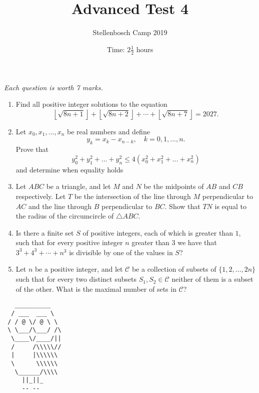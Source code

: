 \documentclass{article}
\title{Advanced Test 4}
\author{Stellenbosch Camp 2019}
\date{Time: $2\frac{1}{2}$ hours}
\begin{document}
\maketitle
\thispagestyle{empty}

\hfill\textit{Each question is worth 7 marks.}

\vfill
\vfill


\begin{enumerate}[1.]

\item %
\newcommand{\floorsqrt}[1]{\left\lfloor\sqrt{#1}\right\rfloor}
Find all positive integer solutions to the equation
\[ \floorsqrt{8n+1} +\floorsqrt{8n+2} +\dotsb +\floorsqrt{8n+7} = 2027. \]


\vfill

\item %
Let $x_0, x_1,..., x_n$ be real numbers and define
\[y_k=x_k-x_{n-k}, \quad k=0,1,...,n.\]
Prove that 
\[y_0^2+ y_1^2+...+ y_n^2 \leq 4(x_0^2 + x_1^2 + ... + x_n^2) \]
and determine when equality holds


\vfill

\item %
Let $ABC$ be a triangle, and let $M$ and $N$ be the midpoints of $AB$ and $CB$ respectively.
Let $T$ be the intersection of the line through $M$ perpendicular to $AC$ and the line through $B$ perpendicular to $BC$.
Show that $TN$ is equal to the radius of the circumcircle of $\triangle ABC$.


\vfill

\item %
Is there a finite set $S$ of positive integers, each of which is greater than $1$, such that for every positive integer $n$ greater than $3$ we have that $3^3 +4^3 +\dotsb +n^3$ is divisible by one of the values in $S$?


\vfill

\item %
\newcommand{\CC}{\mathcal{C}}
Let $n$ be a positive integer, and let $\CC$ be a collection of subsets of $\{1, 2, \dotsc, 2n\}$ such that for every two distinct subsets $S_1, S_2 \in \CC$ neither of them is a subset of the other.
What is the maximal number of sets in $\CC$?


\end{enumerate}


\vfill
\vfill
\begin{center}
\begin{BVerbatim}
   __________
  / ___  ___ \
 / / @ \/ @ \ \
 \ \___/\___/ /\
  \____\/____/||
  /     /\\\\\//
  |     |\\\\\\
  \      \\\\\\
   \______/\\\\
     ||_||_
     -- --
\end{BVerbatim}
\end{center}
\end{document}
